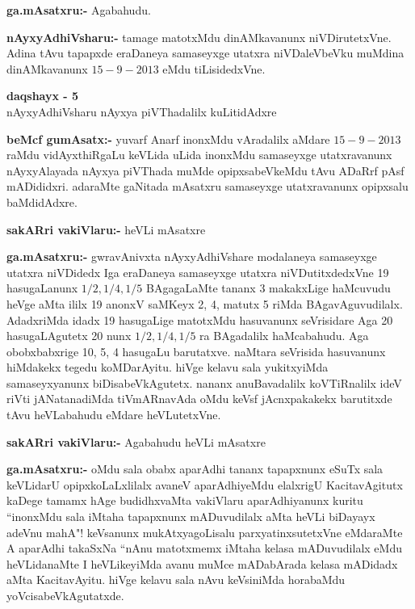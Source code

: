 \smallskip
\noindent
\textbf{ga.mAsatxru:-} Agabahudu.

\smallskip
\noindent
\textbf{nAyxyAdhiVsharu:-} tamage matotxMdu dinAMkavanunx niVDirutetxVne. Adina tAvu tapapxde eraDaneya samaseyxge utatxra niVDaleVbeVku muMdina dinAMkavanunx $15-9-2013$ eMdu tiLisidedxVne.

\begin{center}
{\bf  daqshayx - {\rm 5}}\\
nAyxyAdhiVsharu nAyxya piVThadalilx kuLitidAdxre
\end{center}

\smallskip
\noindent
\textbf{beMcf gumAsatx:-} yuvarf Anarf inonxMdu vAradalilx aMdare $15-9-2013$ raMdu vidAyxthiRgaLu keVLida uLida inonxMdu samaseyxge utatxravanunx nAyxyAlayada nAyxya piVThada muMde opipxsabeVkeMdu tAvu ADaRrf pAsf mADididxri. adaraMte gaNitada mAsatxru samaseyxge utatxravanunx opipxsalu baMdidAdxre.

\smallskip
\noindent
\textbf{sakARri vakiVlaru:-} heVLi mAsatxre

\smallskip
\noindent
\textbf{ga.mAsatxru:-} gwravAnivxta nAyxyAdhiVshare modalaneya samaseyxge utatxra niVDidedx Iga eraDaneya samaseyxge utatxra niVDutitxdedxVne {\rm 19} hasugaLanunx $1/2, 1/4, 1/5$ BAgagaLaMte tananx {\rm 3} makakxLige haMcuvudu heVge aMta ililx {\rm 19} anonxV saMKeyx {\rm 2, 4}, matutx {\rm 5} riMda BAgavAguvudilalx. AdadxriMda idadx {\rm 19} hasugaLige matotxMdu hasuvanunx seVrisidare Aga {\rm 20} hasugaLAgutetx {\rm 20} nunx $1/2, 1/4, 1/5$ ra BAgadalilx haMcabahudu. Aga obobxbabxrige {\rm 10, 5, 4} hasugaLu barutatxve. naMtara seVrisida hasuvanunx hiMdakekx tegedu koMDarAyitu. hiVge kelavu sala yukitxyiMda samaseyxyanunx biDisabeVkAgutetx. nananx anuBavadalilx koVTiRnalilx ideV riVti jANatanadiMda tiVmARnavAda oMdu keVsf jAcnxpakakekx barutitxde tAvu heVLabahudu eMdare heVLutetxVne.

\smallskip
\noindent
\textbf{sakARri vakiVlaru:-} Agabahudu heVLi mAsatxre 

\smallskip
\noindent
\textbf{ga.mAsatxru:-} oMdu sala obabx aparAdhi tananx tapapxnunx eSuTx sala keVLidarU opipxkoLaLxlilalx avaneV aparAdhiyeMdu elalxrigU KacitavAgitutx kaDege tamamx hAge budidhxvaMta vakiVlaru aparAdhiyanunx kuritu ``inonxMdu sala iMtaha tapapxnunx mADuvudilalx aMta heVLi biDayayx adeVnu mahA"! keVsanunx mukAtxyagoLisalu parxyatinxsutetxVne eMdaraMte A aparAdhi takaSxNa ``nAnu matotxmemx iMtaha kelasa mADuvudilalx eMdu heVLidanaMte  I heVLikeyiMda avanu muMce mADabArada kelasa mADidadx aMta KacitavAyitu. hiVge kelavu sala nAvu keVsiniMda horabaMdu yoVcisabeVkAgutatxde.

